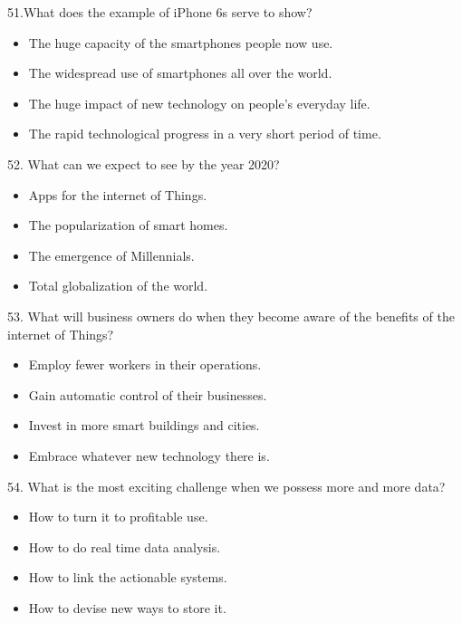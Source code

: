 \documentclass[UTF8,11pt]{ctexart}
\begin{document}
51.What does the example of iPhone 6s serve to show?


\begin{itemize}[leftmargin=2em,itemsep=.2em,topsep=.4em]\item[A.] The huge capacity of the smartphones people now use.
\item[B.] The widespread use of smartphones all over the world.
\item[C.] The huge impact of new technology on people's everyday life.
\item[D.] The rapid technological progress in a very short period of time.
\end{itemize}

52. What can we expect to see by the year 2020?


\begin{itemize}[leftmargin=2em,itemsep=.2em,topsep=.4em]\item[A.] Apps for the internet of Things.
\item[B.] The popularization of smart homes.
\item[C.] The emergence of Millennials.
\item[D.] Total globalization of the world.
\end{itemize}

53. What will business owners do when they become aware of the benefits of the internet of Things?


\begin{itemize}[leftmargin=2em,itemsep=.2em,topsep=.4em]\item[A.] Employ fewer workers in their operations.
\item[B.] Gain automatic control of their businesses.
\item[C.] Invest in more smart buildings and cities.
\item[D.] Embrace whatever new technology there is.
\end{itemize}

54. What is the most exciting challenge when we possess more and more data?


\begin{itemize}[leftmargin=2em,itemsep=.2em,topsep=.4em]\item[A.] How to turn it to profitable use.
\item[B.] How to do real time data analysis.
\item[C.] How to link the actionable systems.
\item[D.] How to devise new ways to store it.
\end{itemize}
\end{document}

